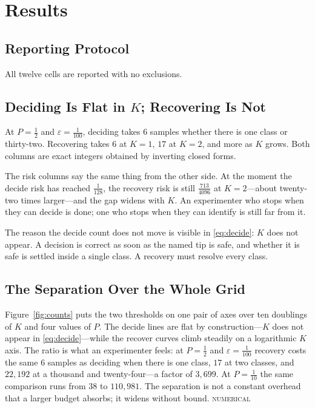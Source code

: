\documentclass[conference]{IEEEtran}
\theoremstyle{definition}
\newcommand{\NUM}{\textsc{numerical}}
\begin{document}
\section{Results}
\label{sec:results}

\subsection{Reporting Protocol}

All twelve cells are reported with no exclusions.

\subsection{Deciding Is Flat in $K$; Recovering Is Not}

At $P=\tfrac12$ and $\varepsilon=\tfrac{1}{100}$, deciding takes $6$ samples whether there is
one class or thirty-two. Recovering takes $6$ at $K=1$, $17$ at $K=2$, and more as $K$ grows.
Both columns are exact integers obtained by inverting closed forms.

The risk columns say the same thing from the other side. At the moment the decide risk has
reached $\tfrac{1}{128}$, the recovery risk is still $\tfrac{713}{4096}$ at $K=2$---about
twenty-two times larger---and the gap widens with $K$. An experimenter who stops when they can
decide is done; one who stops when they can identify is still far from it.



The reason the decide count does not move is visible in \eqref{eq:decide}: $K$ does not appear.
A decision is correct as soon as the named tip is safe, and whether it is safe is settled
inside a single class. A recovery must resolve every class.

\subsection{The Separation Over the Whole Grid}

Figure~\ref{fig:counts} puts the two thresholds on one pair of axes over ten doublings of
$K$ and four values of $P$. The decide lines are flat by construction---$K$ does not appear in
\eqref{eq:decide}---while the recover curves climb steadily on a logarithmic $K$ axis. The
ratio is what an experimenter feels: at $P=\tfrac12$ and $\varepsilon=\tfrac1{100}$ recovery
costs the same $6$ samples as deciding when there is one class, $17$ at two classes, and
$22{,}192$ at a thousand and twenty-four---a factor of $3{,}699$. At $P=\tfrac1{10}$ the same
comparison runs from $38$ to $110{,}981$. The separation is not a constant overhead that a
larger budget absorbs; it widens without bound. \NUM{}
\end{document}
